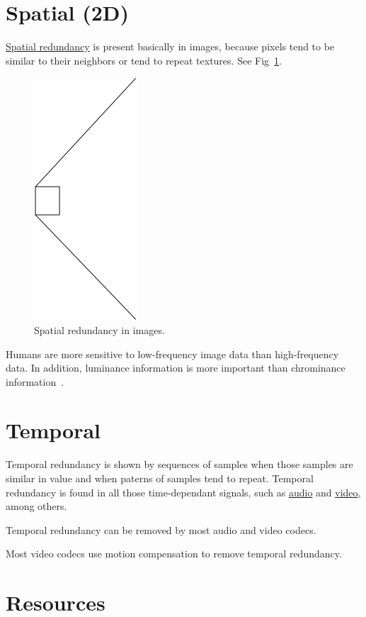 \section{Spatial (2D)}
\href{https://robbfoxx.wordpress.com/2015/07/12/discussion-6-2-1-what-is-redundancy-temporal-redundancy-and-spatial-redundancy/}{Spatial
  redundancy} is present basically in images, because pixels tend to
be similar to their neighbors or tend to repeat textures. See
Fig~\ref{fig:correlacion_lena}.

\begin{figure}
  \includegraphics{graphics/correlacion_lena}
  \caption{Spatial redundancy in images.}
  \label{fig:correlacion_lena}
\end{figure}

Humans are more sensitive to low-frequency image data than
high-frequency data. In addition, luminance information is more
important than chrominance information~\cite{kondoz2009visual}.

\section{Temporal}
Temporal redundancy is shown by sequences of samples when those
samples are similar in value and when paterns of samples tend to
repeat. Temporal redundancy is found in all those time-dependant
signals, such as
\href{https://en.wikipedia.org/wiki/Inter_frame}{audio} and
\href{https://en.wikipedia.org/wiki/Inter_frame}{video}, among others.

Temporal redundancy can be removed by most audio and video codecs.

Most video codecs use motion compensation to remove temporal redundancy.

\section{Resources}
\renewcommand{\addcontentsline}[3]{}%

